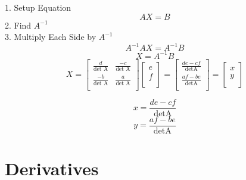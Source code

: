 \documentclass[12pt]{article}
\numberwithin{equation}{subsection}
\begin{document}
\begin{flushleft}
1. Setup Equation 
\begin{equation}
AX=B
\end{equation}
2. Find $A^{-1}$\\
3. Multiply Each Side by $A^{-1}$
\begin{equation}
A^{-1}AX=A^{-1}B
\end{equation}
\begin{equation}
X=A^{-1}B
\end{equation}
\begin{equation}
X=\begin{bmatrix}
\frac{d}{\textrm{det A}} & \frac{-c}{\textrm{det A}} \\
\frac{-b}{\textrm{det A}} & \frac{a}{\textrm{det A}} \\
\end{bmatrix}
\begin{bmatrix}
e\\
f\\
\end{bmatrix}
=
\begin{bmatrix}
\frac{de-cf}{\textrm{detA}}\\
\frac{af-be}{\textrm{detA}}\\
\end{bmatrix}
= \begin{bmatrix}
x\\
y\\
\end{bmatrix}
\end{equation}

\begin{equation}
x=\frac{de-cf}{\textrm{detA}}
\end{equation}
\begin{equation}
y=\frac{af-be}{\textrm{detA}}
\end{equation}




\newpage
\end{flushleft}



\section{Derivatives}
\end{document}
